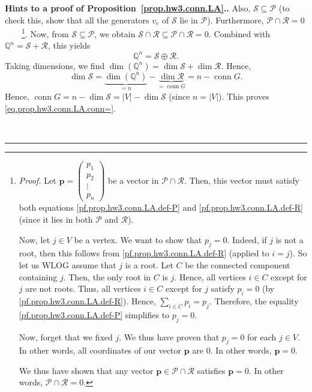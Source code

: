 \documentclass[numbers=enddot,12pt,final,onecolumn,notitlepage]{scrartcl}%
\theoremstyle{definition}
\newenvironment{proof}[1][Proof]{\noindent\textbf{#1.} }{\ \rule{0.5em}{0.5em}}
\let\sumnonlimits\sum
\renewcommand{\sum}{\sumnonlimits\limits}
\newcommand{\conn}{\operatorname{conn}}
\newcommand{\QQ}{\mathbb{Q}}
\newcommand{\abs}[1]{\left| #1 \right|}
\newcommand{\tup}[1]{\left( #1 \right)}
\begin{document}
\begin{proof}[Hints to a proof of Proposition~\ref{prop.hw3.conn.LA}.]
Also, $\mathcal{S} \subseteq \mathcal{P}$ (to check this,
show that all the generators $v_e$ of $\mathcal{S}$ lie in
$\mathcal{P}$).
Furthermore,
$\mathcal{P} \cap \mathcal{R} = 0$\ \ \ \ \footnote{
  \textit{Proof.} Let $\mathbf{p} = \left(
   \begin{matrix} p_1 \\ p_2 \\ \vdots \\ p_n \end{matrix}
    \right)$ be a vector in $\mathcal{P} \cap \mathcal{R}$.
  Then, this vector must satisfy both equations
  \eqref{pf.prop.hw3.conn.LA.def-P} and
  \eqref{pf.prop.hw3.conn.LA.def-R} (since it lies in
  both $\mathcal{P}$ and $\mathcal{R}$).
  \par
  Now, let $j \in V$ be a vertex.
  We want to show that $p_j = 0$.
  Indeed, if $j$ is not a root, then this follows
  from \eqref{pf.prop.hw3.conn.LA.def-R} (applied to $i = j$).
  So let us WLOG assume that $j$ is a root.
  Let $C$ be the connected component containing $j$.
  Then, the only root in $C$ is $j$.
  Hence, all vertices $i \in C$ except for $j$ are not
  roots.
  Thus, all vertices $i \in C$ except for $j$ satisfy
  $p_i = 0$ (by \eqref{pf.prop.hw3.conn.LA.def-R}).
  Hence, $\sum_{i \in C} p_i = p_j$. Therefore, the equality
  \eqref{pf.prop.hw3.conn.LA.def-P} simplifies to
  $p_j = 0$.
  \par
  Now, forget that we fixed $j$.
  We thus have proven that $p_j = 0$ for each $j \in V$.
  In other words, all coordinates of our vector $\mathbf{p}$
  are $0$.
  In other words, $\mathbf{p} = 0$.
  \par
  We thus have shown that any vector
  $\mathbf{p} \in \mathcal{P} \cap \mathcal{R}$ satisfies
  $\mathbf{p} = 0$.
  In other words, $\mathcal{P} \cap \mathcal{R} = 0$.}.
Now, from $\mathcal{S} \subseteq \mathcal{P}$, we obtain
$\mathcal{S} \cap \mathcal{R}
\subseteq \mathcal{P} \cap \mathcal{R} = 0$.
Combined with $\QQ^n = \mathcal{S} + \mathcal{R}$, this
yields
\[
\QQ^n = \mathcal{S} \oplus \mathcal{R} .
\]
Taking dimensions, we find
$
\dim \tup{\QQ^n} = \dim \mathcal{S} + \dim \mathcal{R}
$.
Hence,
\[
\dim \mathcal{S} = \underbrace{\dim \tup{\QQ^n}}_{= n}
                    - \underbrace{\dim \mathcal{R}}_{= \conn G}
                 = n - \conn G.
\]
Hence,
$\conn G = n - \dim \mathcal{S} = \abs{V} - \dim \mathcal{S}$
(since $n = \abs{V}$).
This proves \eqref{eq.prop.hw3.conn.LA.conn=}.


\end{proof}
\end{document}
